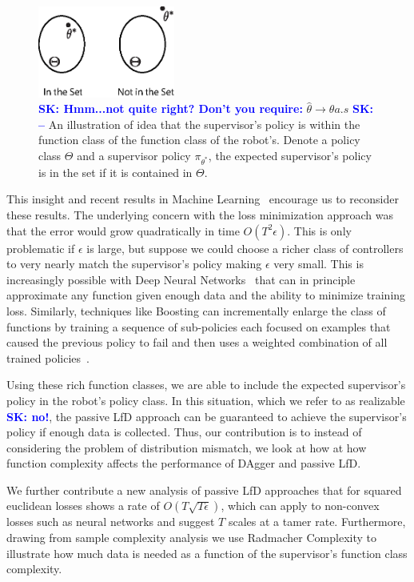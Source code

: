 \documentclass[10pt, conference]{ieeeconf}      %
\newcommand{\sknote}[1]{%
 {\textcolor{blue}{\textbf{SK: #1}}}{}}
\begin{document}
\begin{figure}
\center
\includegraphics[width=0.4\textwidth]{f_figs/realizibility.eps}
\caption{
    \footnotesize
    \sknote{Hmm...not quite right? Don't you require:} $\hat{\theta} \rightarrow \theta a.s$ \sknote{--}
An illustration of idea that the supervisor's policy is within the function class of the function class of the robot's. Denote a policy class $\Theta$ and a supervisor policy $\pi_{\theta^*}$, the expected supervisor's policy is in the set if it is contained in $\Theta$.
}
\vspace*{-20pt}
\label{fig:teaserl}
\end{figure}


This insight and recent results in Machine Learning~\cite{krizhevsky2012imagenet} encourage us to reconsider these results. The underlying concern with the loss minimization approach was that the error would grow quadratically in time $O(T^2\epsilon)$. This is only problematic if $\epsilon$ is large, but suppose we could choose a richer class of controllers to very nearly match the supervisor’s policy making $\epsilon$ very small. This is increasingly possible with Deep Neural Networks~\cite{anthony2009neural} that can in principle approximate any function given enough data and the ability to minimize training loss. Similarly, techniques like Boosting can incrementally enlarge the class of functions by training a sequence of sub-policies each focused on examples that caused the previous policy to fail and then uses a weighted combination of all trained policies~\cite{mason1999boosting}.

Using these rich function classes, we are able to include the expected supervisor's policy in the robot's policy class. In this situation, which we refer to as realizable\sknote{no!}, the passive LfD approach can be guaranteed to achieve the supervisor's policy if enough data is collected. Thus, our contribution is to instead of considering the problem of distribution mismatch, we look at how at how function complexity affects the performance of DAgger and passive LfD. 


We further contribute a new analysis of passive LfD approaches that for squared euclidean losses shows a rate of $O(T\sqrt{T\epsilon})$, which can apply to non-convex losses such as neural networks and suggest $T$ scales at a tamer rate. Furthermore, drawing from sample complexity analysis we use Radmacher Complexity to illustrate how much data is needed as a function of the supervisor's function class complexity. 
\end{document}
